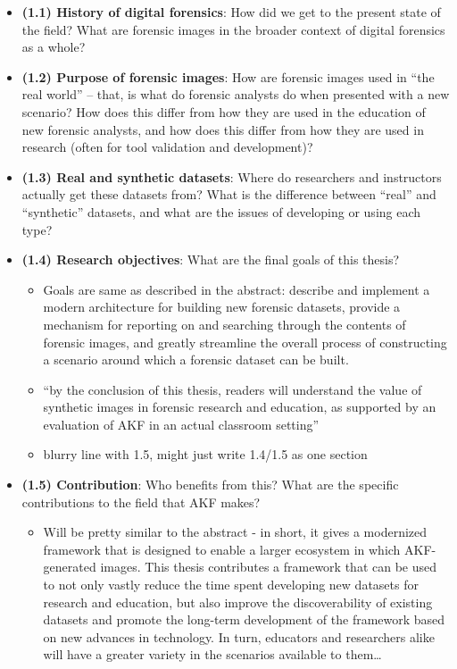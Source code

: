 \begin{itemize}
\tightlist
\item
  \textbf{(1.1) History of digital forensics}: How did we get to the
  present state of the field? What are forensic images in the broader
  context of digital forensics as a whole?
\item
  \textbf{(1.2) Purpose of forensic images}: How are forensic images
  used in ``the real world'' -- that, is what do forensic analysts do
  when presented with a new scenario? How does this differ from how they
  are used in the education of new forensic analysts, and how does this
  differ from how they are used in research (often for tool validation
  and development)?
\item
  \textbf{(1.3) Real and synthetic datasets}: Where do researchers and
  instructors actually get these datasets from? What is the difference
  between ``real'' and ``synthetic'' datasets, and what are the issues
  of developing or using each type?
\item
  \textbf{(1.4) Research objectives}: What are the final goals of this
  thesis?

  \begin{itemize}
  \tightlist
  \item
    Goals are same as described in the abstract: describe and implement
    a modern architecture for building new forensic datasets, provide a
    mechanism for reporting on and searching through the contents of
    forensic images, and greatly streamline the overall process of
    constructing a scenario around which a forensic dataset can be
    built.
  \item
    ``by the conclusion of this thesis, readers will understand the
    value of synthetic images in forensic research and education, as
    supported by an evaluation of AKF in an actual classroom setting''
  \item
    blurry line with 1.5, might just write 1.4/1.5 as one section
  \end{itemize}
\item
  \textbf{(1.5) Contribution}: Who benefits from this? What are the
  specific contributions to the field that AKF makes?

  \begin{itemize}
  \tightlist
  \item
    Will be pretty similar to the abstract - in short, it gives a
    modernized framework that is designed to enable a larger ecosystem
    in which AKF-generated images. This thesis contributes a framework
    that can be used to not only vastly reduce the time spent developing
    new datasets for research and education, but also improve the
    discoverability of existing datasets and promote the long-term
    development of the framework based on new advances in technology. In
    turn, educators and researchers alike will have a greater variety in
    the scenarios available to them\ldots{}
  \end{itemize}
\end{itemize}

